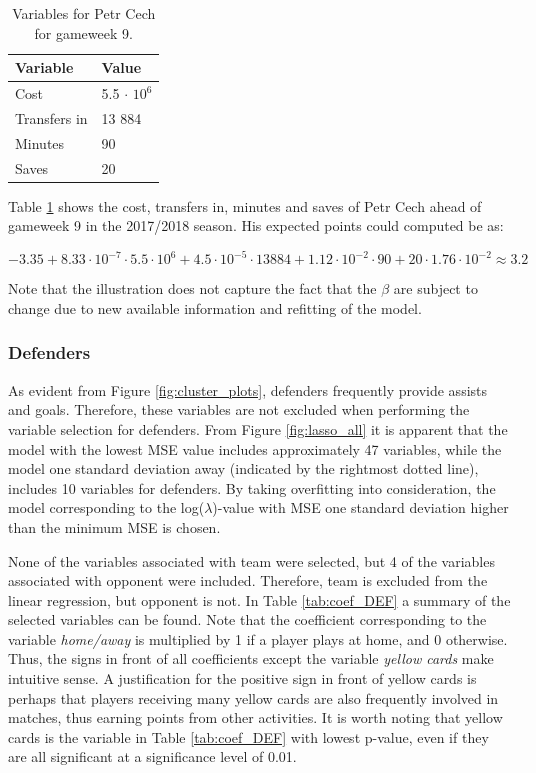 \begin{table}[H]
\centering
\begin{tabular}{|l|l|}
\hline
Variable     & Value   \\ \hline
Cost         & 5.5 $\cdot$ $10^6$ \\
Transfers in & 13 884   \\
Minutes      & 90      \\
Saves        & 20     \\
\hline
\end{tabular}
\caption{Variables for Petr Cech for gameweek 9.}
\label{tab:var_petr}
\end{table}

Table \ref{tab:var_petr} shows the cost, transfers in, minutes and saves of Petr Cech ahead of gameweek 9 in the 2017/2018 season. His expected points could computed be as:

\begin{equation*}
    -3.35 + 8.33\cdot10^{-7}\cdot5.5\cdot10^6 + 4.5\cdot10^{-5}\cdot13 884 + 1.12\cdot10^{-2}\cdot90 + 20\cdot1.76\cdot10^{-2} \approx 3.2
\end{equation*}

Note that the illustration does not capture the fact that the $\beta$ are subject to change due to new available information and refitting of the model.


\subsubsection{Defenders}

As evident from Figure \ref{fig:cluster_plots}, defenders frequently provide assists and goals. Therefore, these variables are not excluded when performing the variable selection for defenders. From Figure \ref{fig:lasso_all} it is apparent that the model with the lowest MSE value includes approximately 47 variables, while the model one standard deviation away (indicated by the rightmost dotted line), includes 10 variables for defenders. By taking overfitting into consideration, the model corresponding to the log($\lambda$)-value with MSE one standard deviation higher than the minimum MSE is chosen.

\newpar

None of the variables associated with team were selected, but 4 of the variables associated with opponent were included. Therefore, team is excluded from the linear regression, but opponent is not. In Table \ref{tab:coef_DEF} a summary of the selected variables can be found. Note that the coefficient corresponding to the variable \textit{home/away} is multiplied by 1 if a player plays at home, and 0 otherwise. Thus, the signs in front of all coefficients except the variable \textit{yellow cards} make intuitive sense. A justification for the positive sign in front of yellow cards is perhaps that players receiving many yellow cards are also frequently involved in matches, thus earning points from other activities. It is worth noting that yellow cards is the variable in Table \ref{tab:coef_DEF} with lowest p-value, even if they are all significant at a significance level of 0.01.

